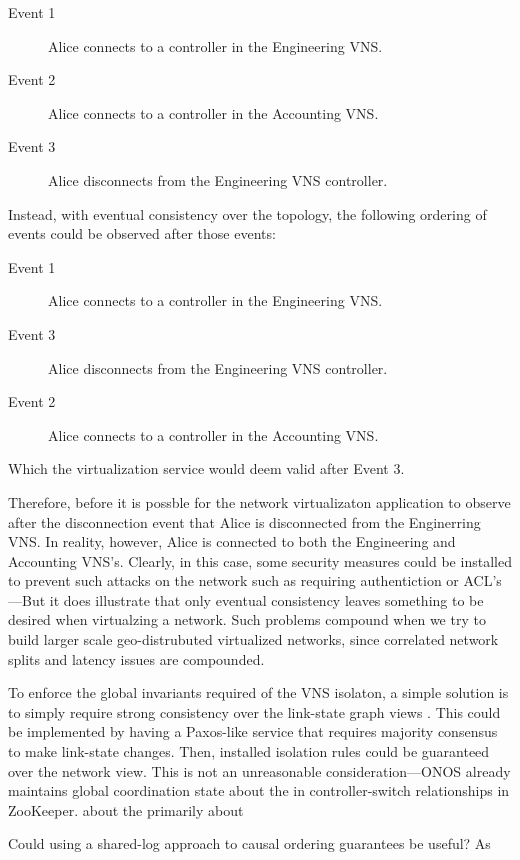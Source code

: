 \documentclass[letterpaper,twocolumn,10pt]{article}
\begin{document}
\begin{description}
\item [Event 1] Alice connects to a controller in the Engineering VNS.
\item [Event 2] Alice connects to a controller in the Accounting VNS.
\item [Event 3] Alice disconnects from  the Engineering VNS controller.
\end{description}

Instead, with eventual consistency over the topology, the following ordering of events could be observed after those events:

\begin{description}
\item [Event 1] Alice connects to a controller in the Engineering VNS.
\item [Event 3] Alice disconnects from the Engineering VNS controller.
\item [Event 2] Alice connects to a controller in the Accounting VNS.
\end{description}

Which the virtualization service would deem valid after Event 3.

Therefore, before it is possble for the network virtualizaton application to observe after the disconnection event that Alice is disconnected from the Enginerring VNS. In reality, however, Alice is connected to both the Engineering and Accounting VNS's. Clearly, in this case, some security measures could be installed to prevent such attacks on the network such as requiring authentiction or ACL's---But it does illustrate that only eventual consistency leaves something to be desired when virtualzing a network. Such problems compound when we try to build larger scale geo-distrubuted virtualized networks, since correlated network splits and latency issues are compounded.

To enforce the global invariants required of the VNS isolaton, a simple solution is to simply require strong consistency over the link-state graph views \cite{bgp:rfc}. This could be implemented by having a Paxos-like service that requires majority consensus to make link-state changes. Then, installed isolation rules could be guaranteed over the network view. This is not an unreasonable consideration---ONOS already maintains global coordination state about the in
controller-switch relationships in ZooKeeper.
about the primarily about 

Could using a shared-log approach to causal ordering guarantees be useful? As 
\end{document}
